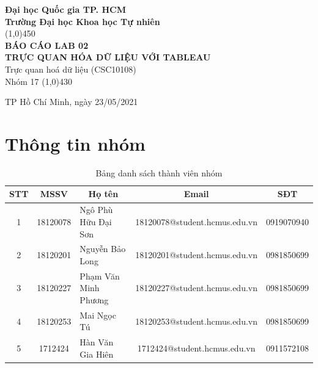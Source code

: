 \documentclass[a4paper, 12pt]{article}
\begin{document}
\begin{titlepage}
    \begin{center}
        \vspace*{1cm}
        \Large\textbf{Đại học Quốc gia TP. HCM\\Trường Đại học Khoa học Tự nhiên}\\

        \vfill
        \line(1,0){450}\\[4mm]
        \LARGE\textbf{\MakeUppercase{Báo cáo Lab 02\\ Trực quan hóa dữ liệu với Tableau}}\\[3mm]
        \Large{Trực quan hoá dữ liệu (CSC10108)}\\[3mm]
        \Large{Nhóm 17}
        \line(1,0){430}\\
        \vfill

        \vfill
        TP Hồ Chí Minh, ngày 23/05/2021
    \end{center}
\end{titlepage}

\tableofcontents
\thispagestyle{empty}
\clearpage

\section{Thông tin nhóm}
    \begin{table}[H]
        \begin{tabular}{|c|c|l|c|c|}
        \hline
        STT & MSSV     & \multicolumn{1}{c|}{Họ tên} & Email                         & SĐT        \\ \hline
        1   & 18120078 & Ngô Phù Hữu Đại Sơn         & 18120078@student.hcmus.edu.vn & 0919070940 \\ \hline
        2   & 18120201 & Nguyễn Bảo Long             & 18120201@student.hcmus.edu.vn & 0981850699 \\ \hline
        3   & 18120227 & Phạm Văn Minh Phương             & 18120227@student.hcmus.edu.vn & 0981850699 \\ \hline
        4   & 18120253 & Mai Ngọc Tú             & 18120253@student.hcmus.edu.vn & 0981850699 \\ \hline
        5   & 1712424 & Hàn Văn Gia Hiên            & 1712424@student.hcmus.edu.vn & 0911572108 \\ \hline
        \end{tabular}
        \caption{Bảng danh sách thành viên nhóm}
    \end{table}
\end{document}
